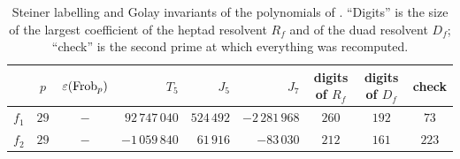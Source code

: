 \begin{table}[ht]
\centering\small
\begin{tabular}{@{}lccrrrccc@{}}
\toprule
 & $p$ & $\varepsilon(\operatorname{Frob}_p)$ & $T_5$ & $J_5$ & $J_7$ & digits of $R_f$ & digits of $D_f$ & check\\
\midrule
$f_1$ & $29$ & $-$ & $92\,747\,040$ & $524\,492$ & $-2\,281\,968$ & $260$ & $192$ & $73$\\
$f_2$ & $29$ & $-$ & $-1\,059\,840$ & $61\,916$ & $-83\,030$ & $212$ & $161$ & $223$\\
\bottomrule
\end{tabular}
\caption{Steiner labelling and Golay invariants of the polynomials of \cite[Examples 1.2, 3.17]{HJLPPZ26}. ``Digits'' is the size of the largest coefficient of the heptad resolvent $R_f$ and of the duad resolvent $D_f$; ``check'' is the second prime at which everything was recomputed.}
\label{tab:invariants}
\end{table}
